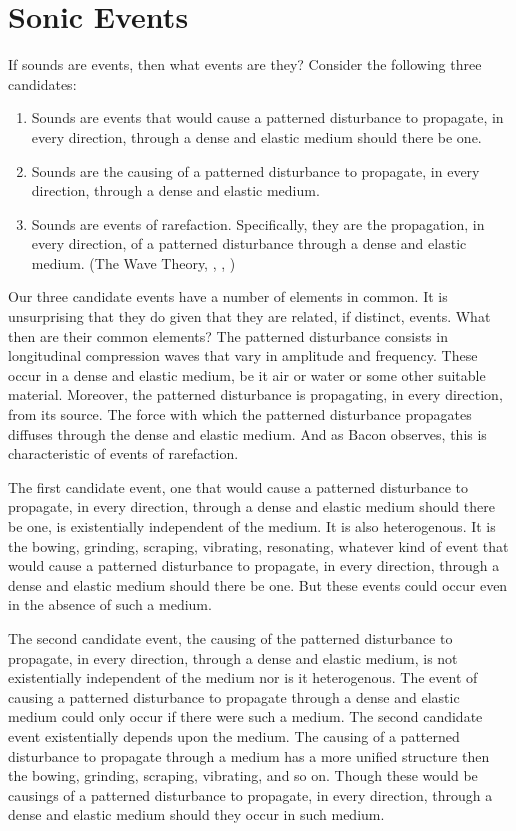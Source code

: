 \documentclass[12pt]{article}
\begin{document}

\section{Sonic Events} %
\label{sec:sonic_events}

If sounds are events, then what events are they? Consider the following three candidates:

\begin{enumerate}
	\item Sounds are events that would cause a patterned disturbance to propagate, in every direction, through a dense and elastic medium should there be one. \citep{Casati:1994aa}
	\item Sounds are the causing of a patterned disturbance to propagate, in every direction, through a dense and elastic medium. \citep{OCallaghan:2007xy}
	\item Sounds are events of rarefaction. Specifically, they are the propagation, in every direction, of a patterned disturbance through a dense and elastic medium. (The Wave Theory, \citealt{OShaughnessy:2009aa}, \citealt{Sorensen:2009aa}, \citealt[chapters 3–4]{Kalderon:2018oe})
\end{enumerate}
Our three candidate events have a number of elements in common. It is unsurprising that they do given that they are related, if distinct, events. What then are their common elements? The patterned disturbance consists in longitudinal compression waves that vary in amplitude and frequency. These occur in a dense and elastic medium, be it air or water or some other suitable material. Moreover, the patterned disturbance is propagating, in every direction, from its source. The force with which the patterned disturbance propagates diffuses through the dense and elastic medium. And as Bacon observes, this is characteristic of events of rarefaction.

The first candidate event, one that would cause a patterned disturbance to propagate, in every direction, through a dense and elastic medium should there be one, is existentially independent of the medium. It is also heterogenous. It is the bowing, grinding, scraping, vibrating, resonating, whatever kind of event that would cause a patterned disturbance to propagate, in every direction, through a dense and elastic medium should there be one. But these events could occur even in the absence of such a medium.

The second candidate event, the causing of the patterned disturbance to propagate, in every direction, through a dense and elastic medium, is not existentially independent of the medium nor is it heterogenous. The event of causing a patterned disturbance to propagate through a dense and elastic medium could only occur if there were such a medium. The second candidate event existentially depends upon the medium. The causing of a patterned disturbance to propagate through a medium has a more unified structure then the bowing, grinding, scraping, vibrating, and so on. Though these would be causings of a patterned disturbance to propagate, in every direction, through a dense and elastic medium should they occur in such medium.
\end{document}
